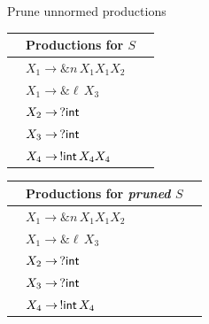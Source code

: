 \message{ !name(main.tex)}\documentclass[10pt]{beamer}
\begin{document}
\begin{frame} {Prune unnormed productions}
	\vspace*{-2mm}
	\hspace*{5mm}\begin{tabular}{l l l }
 		&Productions for $S$&  \\ \hline
 	 	&$X_1 \rightarrow \& n\, X_1 X_1 X_2$ &\\
 	 	&$X_1 \rightarrow \& \ell\, X_3$ &\\
 	 	&$X_2 \rightarrow \,? \mathsf{int}$&\\
 	 	&$X_3 \rightarrow \,? \mathsf{int}$&\\
 	 	&$X_4 \rightarrow \,!\mathsf{int}\, X_4 X_4$ &\\
	\end{tabular}
	\hspace*{1cm} \pause
	\begin{tabular}{l l l }
 		&Productions for \emph{pruned} $S$&  \\ \hline
  		&\hspace*{4mm}$X_1 \rightarrow \& n\, X_1 X_1 X_2$ & \\
  		&\hspace*{4mm}$X_1 \rightarrow \& \ell\, X_3$ &\\
 		&\hspace*{4mm}$X_2 \rightarrow \,? \mathsf{int}$&\\
  		&\hspace*{4mm}$X_3 \rightarrow \,? \mathsf{int}$&\\
  		&\hspace*{4mm}$X_4 \rightarrow \,!\mathsf{int}\, X_4 $ &\\
	\end{tabular}
 	\vspace*{2mm}
\end{frame}
\end{document}
